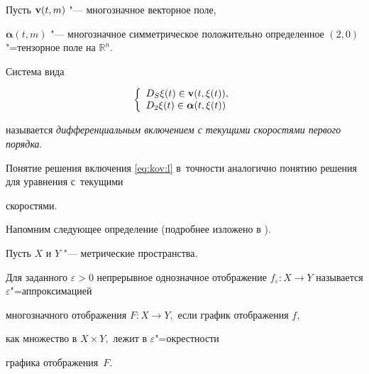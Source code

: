 \smallskip




 Пусть ${\bf v}(t,m)$ "--- многозначное векторное поле, 

 ${\boldsymbol\alpha}(t,m)$ "--- многозначное симметрическое               положительно определенное $(2,0)$"=тензорное поле на $\mathbb{R}^n$.



Система вида



\begin{equation}\label{eq:kov:l}

              \left\{

              \begin{array}{l}

              D_S\xi(t)\in {\bf v}(t,\xi(t)), \\

              D_2\xi(t)\in{\boldsymbol \alpha}(t,\xi(t))

              \end{array}

              \right.%

              \end{equation}

называется \emph{дифференциальным включением с текущими скоростями первого порядка}.







Понятие решения включения \eqref{eq:kov:l} в~точности аналогично понятию решения для уравнения с~текущими

скоростями.





 Напомним следующее определение (подробнее изложено в \cite{popovkoval:bib:BGMO}).



\smallskip 

 

       \begin{definition}[2]\label{epsilon}{Пусть $X$ и $Y$ "--- метрические пространства$.$ 

       Для заданного        $\varepsilon >0$ непрерывное однозначное отображение        $f_\varepsilon:X\to Y$ называется $\varepsilon$"=аппроксимацией

       многозначного отображения $F:X\to Y,$ если график отображения $f,$

       как множество в $X\times Y,$ лежит в $\varepsilon$"=окрестности

       графика отображения~$F.$}

       \end{definition}



